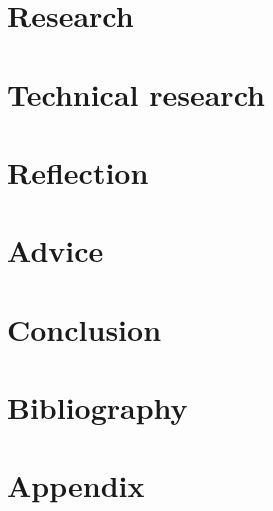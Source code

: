 \documentclass{article}
\begin{document}
\newpage
\section{Research}

\newpage
\section{Technical research}

\newpage
\section{Reflection}

\newpage
\section{Advice}

\newpage
\section{Conclusion}

\newpage
\section{Bibliography}

\newpage
\section{Appendix}
\end{document}
